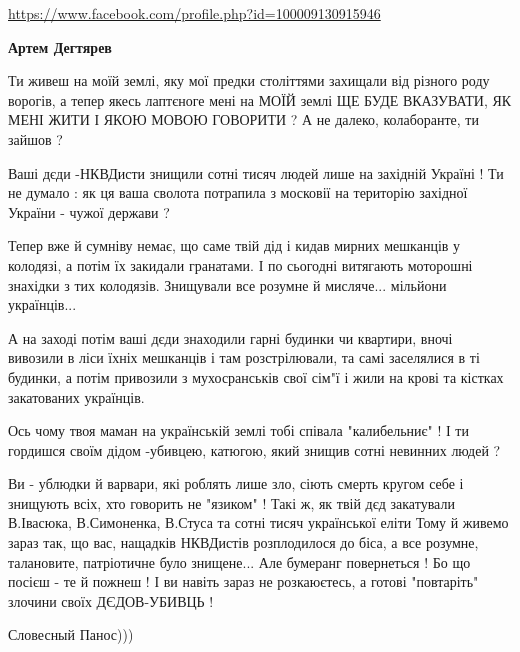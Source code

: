 \begin{itemize}
\begin{itemize}
\begin{itemize}
\url{https://www.facebook.com/profile.php?id=100009130915946}\par
 
\textbf{Артем Дегтярев} 

Ти живеш на моїй землі, яку мої предки століттями захищали від різного роду
ворогів, а тепер якесь лаптєноге мені на МОЇЙ землі ЩЕ БУДЕ ВКАЗУВАТИ, ЯК МЕНІ
ЖИТИ І ЯКОЮ МОВОЮ ГОВОРИТИ ? А не далеко, колаборанте, ти зайшов ? 

Ваші дєди -НКВДисти знищили сотні тисяч людей лише на західній Україні ! Ти не
думало : як ця ваша сволота потрапила з московії на територію західної України
- чужої держави ? 

Тепер вже й сумніву немає, що саме твій дід і кидав мирних мешканців у
колодязі, а потім їх закидали гранатами. І по сьогодні витягають моторошні
знахідки з тих колодязів. Знищували все розумне й мисляче... мільйони
українців... 

А на заході потім ваші дєди знаходили гарні будинки чи квартири, вночі вивозили
в ліси їхніх мешканців і там розстрілювали, та самі заселялися в ті будинки, а
потім привозили з мухосранськів свої сім"ї і жили на крові та кістках
закатованих українців. 

Ось чому твоя маман на українській землі тобі співала "калибельниє" ! І ти
гордишся своїм дідом -убивцею, катюгою, який знищив сотні невинних людей ? 

Ви - ублюдки й варвари, які роблять лише зло, сіють смерть кругом себе і
знищують всіх, хто говорить не "язиком" ! Такі ж, як твій дєд закатували
В.Івасюка, В.Симоненка, В.Стуса та сотні тисяч української еліти Тому й живемо
зараз так, що вас, нащадків НКВДистів розплодилося до біса, а все розумне,
талановите, патріотичне було знищене... Але бумеранг повернеться ! Бо що посієш
- те й пожнеш ! І ви навіть зараз не розкаюєтесь, а готові "повтаріть" злочини
своїх ДЄДОВ-УБИВЦЬ !


 
Словесный Панос)))


\end{itemize}
\end{itemize}
\end{itemize}
